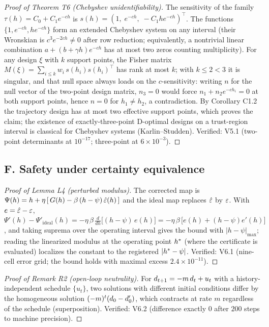 \documentclass[11pt]{article}
\begin{document}
\begin{proof}[Proof of Theorem T6 (Chebyshev unidentifiability)]
The sensitivity of the family $\tau(h) = C_0 + C_1 e^{-ch}$ is
$s(h) = (1,\; e^{-ch},\; -C_1 h e^{-ch})^\top$. The functions
$\{1, e^{-ch}, h e^{-ch}\}$ form an extended Chebyshev system on any
interval (their Wronskian is $c^3 e^{-2ch} \ne 0$ after row reduction;
equivalently, a nontrivial linear combination
$a + (b + \gamma h)e^{-ch}$ has at most two zeros counting multiplicity).
For any design $\xi$ with $k$ support points, the Fisher matrix
$M(\xi) = \sum_{i\le k} w_i\, s(h_i) s(h_i)^\top$ has rank at most $k$;
with $k \le 2 < 3$ it is singular, and that null space always loads on
the $c$-sensitivity: writing $n$ for the null vector of the two-point
design matrix, $n_3 = 0$ would force $n_1 + n_2 e^{-ch_i} = 0$ at both
support points, hence $n = 0$ for $h_1 \neq h_2$, a contradiction. By
Corollary C1.2 the trajectory design has at most two effective support
points, which proves the claim; the existence of exactly-three-point
D-optimal designs on a trust-region interval is classical for Chebyshev
systems (Karlin--Studden). Verified: V5.1 (two-point determinants at
$10^{-17}$; three-point at $6\times 10^{-3}$).
\end{proof}

\subsection*{F. Safety under certainty equivalence}

\begin{proof}[Proof of Lemma L4 (perturbed modulus)]
The corrected map is $\Psi(h) = h + \eta\,[\,G(h) - \beta\,(h-\psi)\,
\hat{\varepsilon}(h)\,]$ and the ideal map replaces $\hat{\varepsilon}$ by $\varepsilon$. With
$e = \hat{\varepsilon} - \varepsilon$,
$\Psi'(h) - \Psi'_{\mathrm{ideal}}(h) = -\eta\,\beta\,\tfrac{d}{dh}
\big[(h-\psi)\,e(h)\big] = -\eta\,\beta\,\big[e(h) + (h-\psi)e'(h)\big]$,
and taking suprema over the operating interval gives the bound with
$|h-\psi|_{\max}$; reading the linearized modulus at the operating point
$h^{*}$ (where the certificate is evaluated) localizes the constant to
the registered $|h^{*}-\psi|$. Verified: V6.1 (nine-cell error grid; the bound holds
with maximal excess $2.4\times10^{-11}$).
\end{proof}

\begin{proof}[Proof of Remark R2 (open-loop neutrality)]
For $d_{t+1} = -m\,d_t + u_t$ with a history-independent schedule
$\{u_t\}$, two solutions with different initial conditions differ by the
homogeneous solution $(-m)^t(d_0 - d_0')$, which contracts at rate
$m$ regardless of the schedule (superposition). Verified: V6.2 (difference
exactly $0$ after $200$ steps to machine precision).
\end{proof}
\end{document}

